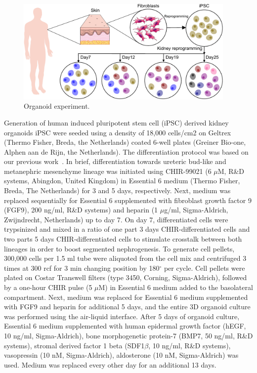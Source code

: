 \begin{figure}[!ht]
	\centering
	\includegraphics[width=0.95\textwidth]{Organoid_exp/fig}
	\vspace{0.1cm}
	\caption[Organoid experiment]{Organoid experiment.}
	\label{fig:organoid_exp}
\end{figure}

Generation of human induced pluripotent stem cell (iPSC) derived kidney organoids iPSC were seeded using a density of 18,000 cells/cm2 on Geltrex (Thermo Fisher, Breda, the Netherlands) coated 6-well plates (Greiner Bio-one, Alphen aan de Rijn, the Netherlands). The differentiation protocol was based on our previous work~\citep{jansen2022sars}. In brief, differentiation towards ureteric bud-like and metanephric mesenchyme lineage was initiated using CHIR-99021 (6 $\mu$M, R\&D systems, Abingdon, United Kingdom) in Essential 6 medium (Thermo Fisher, Breda, The Netherlands) for 3 and 5 days, respectively. Next, medium was  replaced sequentially for Essential 6 supplemented with fibroblast growth factor 9 (FGF9), 200 ng/ml, R\&D systems) and heparin (1 $\mu$g/ml, Sigma-Aldrich, Zwijndrecht, Netherlands) up to day 7. On day 7, differentiated cells were trypsinized and mixed in a ratio of one part 3 days CHIR-differentiated cells and two parts 5 days CHIR-differentiated cells to stimulate crosstalk between both lineages in order to boost segmented nephrogenesis. To generate cell pellets, 300,000 cells per 1.5 ml tube were aliquoted from the cell mix and centrifuged 3 times at 300 rcf for 3 min changing position by 180$^\circ$ per cycle. Cell pellets were plated on Costar Transwell filters (type 3450, Corning, Sigma-Aldrich), followed by a one-hour CHIR pulse (5 $\mu$M) in Essential 6 medium added to the basolateral compartment. Next, medium was replaced for Essential 6 medium supplemented with FGF9 and heparin for additional 5 days, and the entire 3D organoid culture was performed using the air-liquid interface. After 5 days of organoid culture, Essential 6 medium supplemented with human epidermal growth factor (hEGF, 10 ng/ml, Sigma-Aldrich), bone morphogenetic protein-7 (BMP7, 50 ng/ml, R\&D systems), stromal derived factor 1 beta (SDF1$\beta$, 10 ng/ml, R\&D systems), vasopressin (10 nM, Sigma-Aldrich), aldosterone (10 nM, Sigma-Aldrich) was used. Medium was replaced every other day for an additional 13 days. 

